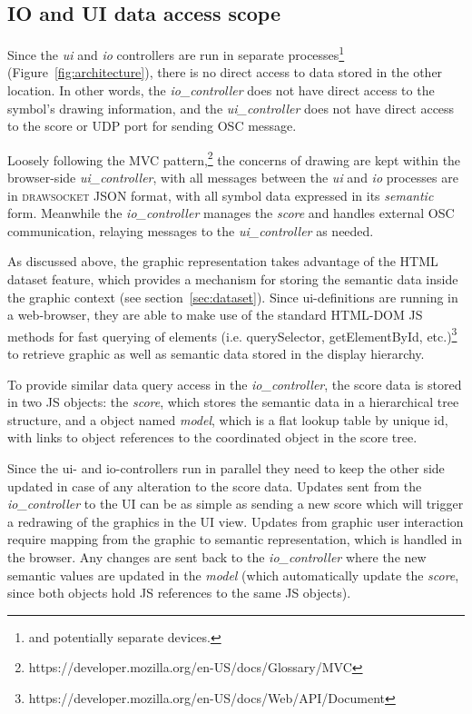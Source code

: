 \documentclass{article}
\def\drawsocket{\textsc{drawsocket}\xspace}
\def\uicontroller{\textit{ui\_controller}\xspace}
\def\iocontroller{\textit{io\_controller}\xspace}
\begin{document}

\subsection*{IO and UI data access scope}\label{sec:io_ui_elements}

Since the \textit{ui} and \textit{io} controllers are run in separate processes\footnote{and potentially separate devices.} (Figure~\ref{fig:architecture}), there is no direct access to data stored in the other location. In other words, the \iocontroller does not have direct access to the symbol's drawing information, and the \uicontroller does not have direct access to the score or UDP port for sending OSC message.

Loosely following the MVC pattern,\footnote{https://developer.mozilla.org/en-US/docs/Glossary/MVC} the concerns of drawing are kept within the browser-side \uicontroller, with all messages between the \textit{ui} and \textit{io} processes are in \drawsocket JSON format, with all symbol data expressed in its \textit{semantic} form.
Meanwhile the \iocontroller manages the \textit{score} and handles external OSC communication, relaying messages to the \uicontroller as needed.

As discussed above, the graphic representation takes advantage of the HTML dataset feature, which provides a mechanism for storing the semantic data inside the graphic context (see section~\ref{sec:dataset}).
Since ui-definitions are running in a web-browser, they are able to make use of the standard HTML-DOM JS methods for fast querying of elements (i.e. querySelector, getElementById, etc.)\footnote{https://developer.mozilla.org/en-US/docs/Web/API/Document} to retrieve graphic as well as semantic data stored in the display hierarchy.

To provide similar data query access in the \iocontroller, the score data is stored in two JS objects: the \textit{score}, which stores the semantic data in a hierarchical tree structure, and a object named \textit{model}, which is a flat lookup table by unique id, with links to object references to the coordinated object in the score tree.

Since the ui- and io-controllers run in parallel they need to keep the other side updated in case of any alteration to the score data. 
Updates sent from the \iocontroller to the UI can be as simple as sending a new score which will trigger a redrawing of the graphics in the UI view. 
Updates from graphic user interaction require mapping from the graphic to semantic representation, which is handled in the browser. Any changes are sent back to the \iocontroller where the new semantic values are updated in the \textit{model} (which automatically update the \textit{score}, since both objects hold JS references to the same JS objects).
\end{document}
